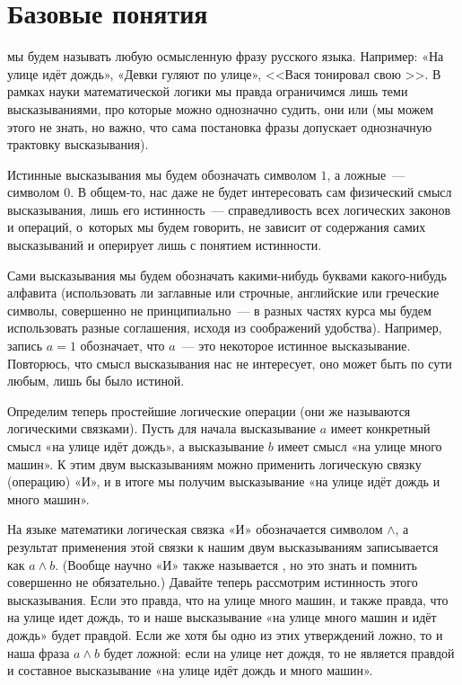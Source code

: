 \section{Базовые понятия}

 мы будем называть любую осмысленную фразу русского языка. Например: «На улице идёт дождь», «Девки гуляют по улице», <<Вася тонировал свою \grqq>>. В рамках науки математической логики мы правда ограничимся лишь теми высказываниями, про которые можно однозначно судить,  они или  (мы можем этого не знать, но важно, что сама постановка фразы допускает однозначную трактовку высказывания).

Истинные высказывания мы будем обозначать символом $1$, а ложные~--- символом $0$. В общем-то, нас даже не будет интересовать сам физический смысл высказывания, лишь его истинность~--- справедливость всех логических законов и операций, о~которых мы будем говорить, не зависит от содержания самих высказываний и оперирует лишь с понятием истинности.

Сами высказывания мы будем обозначать какими-нибудь буквами какого-нибудь алфавита (использовать ли заглавные или строчные, английские или греческие символы, совершенно не принципиально~--- в разных частях курса мы будем использовать разные соглашения, исходя из соображений удобства). Например, запись $a = 1$ обозначает, что $a$~--- это некоторое истинное высказывание. Повторюсь, что смысл высказывания нас не интересует, оно может быть по сути любым, лишь бы было истиной.

Определим теперь простейшие логические операции (они же называются логическими связками). Пусть для начала высказывание $a$ имеет конкретный смысл «на улице идёт дождь», а высказывание $b$ имеет смысл «на улице много машин». К этим двум высказываниям можно применить логическую связку (операцию) «И», и в итоге мы получим высказывание «на улице идёт дождь и много машин».

На языке математики логическая связка «И» обозначается символом $\land$, а результат применения этой связки к нашим двум высказываниям записывается как $a\land b$. (Вообще научно «И» \mbox{также} называется , но это знать и помнить совершенно не обязательно.) Давайте теперь рассмотрим истинность этого высказывания. Если это правда, что на улице много машин, и также правда, что на улице идет дождь, то и наше высказывание «на улице много машин и идёт дождь» будет правдой. Если же хотя бы одно из этих утверждений ложно, то и наша фраза $a \land b$ будет ложной: если на улице нет дождя, то не является правдой и составное высказывание «на улице идёт дождь и много машин».

